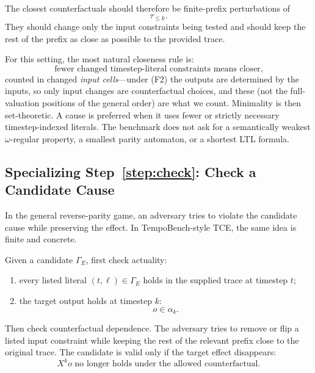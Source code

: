 \documentclass[11pt]{article}
\theoremstyle{remark}
\begin{document}
The closest counterfactuals should therefore be finite-prefix perturbations of
\[
  \tau_{\le k}.
\]
They should change only the input constraints being tested and should keep the
rest of the prefix as close as possible to the provided trace.

For this setting, the most natural closeness rule is:
\[
  \text{fewer changed timestep-literal constraints means closer,}
\]
counted in changed \emph{input cells}---under (F2) the outputs are determined by
the inputs, so only input changes are counterfactual choices, and these (not the
full-valuation positions of the general order) are what we count.
Minimality is then set-theoretic. A cause is preferred when it uses fewer or
strictly necessary timestep-indexed literals. The benchmark does not ask for a
semantically weakest \(\omega\)-regular property, a smallest parity automaton,
or a shortest LTL formula.

\subsection{Specializing Step~\ref{step:check}: Check a Candidate Cause}

In the general reverse-parity game, an adversary tries to violate the candidate
cause while preserving the effect. In TempoBench-style TCE, the same idea is
finite and concrete.

Given a candidate \(\Gamma_E\), first check actuality:
\begin{enumerate}[label=\arabic*.]
  \item every listed literal \((t,\ell)\in\Gamma_E\) holds in the supplied trace
        at timestep \(t\);
  \item the target output holds at timestep \(k\):
        \[
          o\in\alpha_k.
        \]
\end{enumerate}

Then check counterfactual dependence. The adversary tries to remove or flip a
listed input constraint while keeping the rest of the relevant prefix close to
the original trace. The candidate is valid only if the target effect disappears:
\[
  X^k o
  \text{ no longer holds under the allowed counterfactual.}
\]
\end{document}
